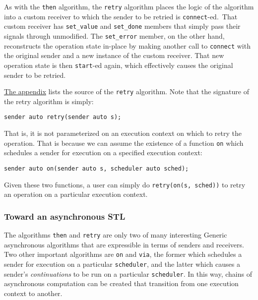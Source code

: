 \documentclass[a4paper,12pt,notitlepage,twoside,openright]{article}
\begin{document}
As with the \texttt{then} algorithm, the
\texttt{retry} algorithm places the logic of the algorithm
into a custom receiver to which the sender to be retried is
\texttt{connect}-ed.~That custom receiver has
\texttt{set_value} and \texttt{set_done} members
that simply pass their signals through unmodified. The
\texttt{set_error} member, on the other hand, reconstructs
the operation state in-place by making another call to
\texttt{connect} with the original sender and a new instance
of the custom receiver. That new operation state is then
\texttt{start}-ed again, which effectively causes the
original sender to be retried.

\protect\hyperlink{appendix-the-retry-algorithm}{The appendix} lists the
source of the \texttt{retry} algorithm. Note that the
signature of the retry algorithm is simply:

\begin{verbatim}
sender auto retry(sender auto s);
\end{verbatim}

That is, it is not parameterized on an execution context on which to
retry the operation. That is because we can assume the existence of a
function \texttt{on} which schedules a sender for execution
on a specified execution context:

\begin{verbatim}
sender auto on(sender auto s, scheduler auto sched);
\end{verbatim}

Given these two functions, a user can simply do
\texttt{retry(on(s, sched))} to retry an operation on a
particular execution context.

\hypertarget{toward-an-asynchronous-stl}{%
\subsubsection{Toward an asynchronous
STL}\label{toward-an-asynchronous-stl}}

The algorithms \texttt{then} and \texttt{retry}
are only two of many interesting Generic asynchronous algorithms that
are expressible in terms of senders and receivers. Two other important
algorithms are \texttt{on} and \texttt{via}, the
former which schedules a sender for execution on a particular
\texttt{scheduler}, and the latter which causes a sender's
\emph{continuations} to be run on a particular
\texttt{scheduler}. In this way, chains of asynchronous
computation can be created that transition from one execution context to
another.
\end{document}
